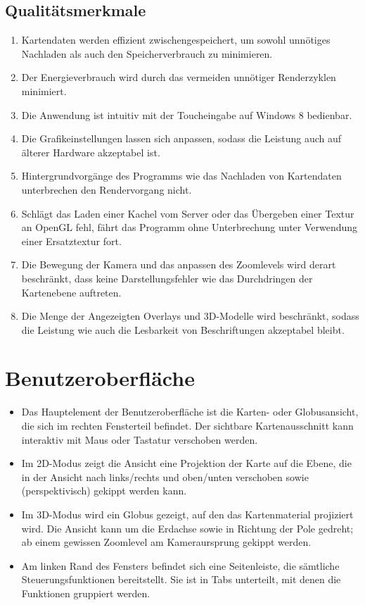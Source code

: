 \documentclass[10pt]{scrreprt}
\begin{document}
\section{Qualitätsmerkmale}

\begin{enumerate}[leftmargin=2cm,resume]
\item Kartendaten werden effizient zwischengespeichert, um sowohl unnötiges Nachladen als auch den Speicherverbrauch zu minimieren.
\item Der Energieverbrauch wird durch das vermeiden unnötiger Renderzyklen minimiert.
\item Die Anwendung ist intuitiv mit der Toucheingabe auf Windows 8 bedienbar.
\item Die Grafikeinstellungen lassen sich anpassen, sodass die Leistung auch auf älterer Hardware akzeptabel ist.
\item Hintergrundvorgänge des Programms wie das Nachladen von Kartendaten unterbrechen den Rendervorgang nicht.
\item Schlägt das Laden einer Kachel vom Server oder das Übergeben einer Textur an OpenGL fehl, fährt das Programm ohne Unterbrechung unter Verwendung einer Ersatztextur fort.
\item Die Bewegung der Kamera und das anpassen des Zoomlevels wird derart beschränkt, dass keine Darstellungsfehler wie das Durchdringen der Kartenebene auftreten.
\item Die Menge der Angezeigten Overlays und 3D-Modelle wird beschränkt, sodass die Leistung wie auch die Lesbarkeit von Beschriftungen akzeptabel bleibt.
\end{enumerate}




\chapter{Benutzeroberfläche}

\begin{itemize}
	\item Das Hauptelement der Benutzeroberfläche ist die Karten- oder Globusansicht, die sich im rechten Fensterteil befindet. Der sichtbare Kartenausschnitt kann interaktiv mit Maus oder Tastatur verschoben werden.
	\item Im 2D-Modus zeigt die Ansicht eine Projektion der Karte auf die Ebene, die in der Ansicht nach links/rechts und oben/unten verschoben sowie (perspektivisch) gekippt werden kann.
	\item Im 3D-Modus wird ein Globus gezeigt, auf den das Kartenmaterial projiziert wird. Die Ansicht kann um die Erdachse sowie in Richtung der Pole gedreht; ab einem gewissen Zoomlevel am Kameraursprung gekippt werden.
	\item Am linken Rand des Fensters befindet sich eine Seitenleiste, die sämtliche Steuerungsfunktionen bereitstellt. Sie ist in Tabs unterteilt, mit denen die Funktionen gruppiert werden.
\end{itemize}
\end{document}
